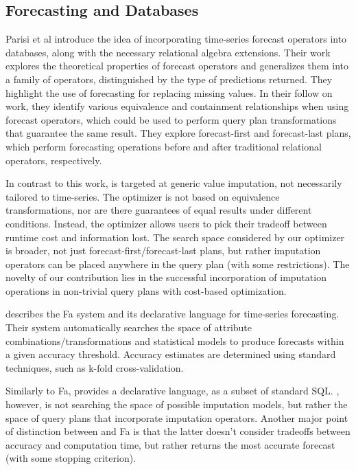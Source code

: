 \subsection{Forecasting and Databases}
Parisi et al\cite{parisi2011embedding} introduce the idea of incorporating time-series forecast operators into
databases, along with the necessary relational algebra extensions. Their work explores the theoretical
properties of forecast operators and generalizes them into a family of operators, distinguished by
the type of predictions returned. They highlight the use of forecasting for replacing missing values.
In their follow on work\cite{parisi2013temporal}, they identify various equivalence and containment
relationships when using forecast operators, which could be used to perform query plan transformations that guarantee the same result. They
explore forecast-first and forecast-last plans, which perform forecasting operations before and after traditional
relational operators, respectively.

In contrast to this work, \ProjectName{} is targeted at generic value imputation, not necessarily tailored to 
time-series. The optimizer is not based on equivalence transformations, nor are there guarantees of equal
results under different conditions. Instead, the optimizer allows users to pick their tradeoff between
runtime cost and information lost. The search space considered by our optimizer is broader, not just
forecast-first/forecast-last plans, but rather imputation operators can be placed anywhere in the query plan
(with some restrictions). The novelty of our contribution lies in the successful incorporation of
imputation operations in non-trivial query plans with cost-based optimization.

\cite{duan2007processing} describes the Fa system and its declarative language for time-series forecasting. Their
system automatically searches the space of attribute combinations/transformations and statistical models
to produce forecasts within a given accuracy threshold. Accuracy estimates are determined using
standard techniques, such as k-fold cross-validation. 

Similarly to Fa, \ProjectName{} provides a declarative language, as
a subset of standard SQL. \ProjectName{}, however, is not searching the space of possible
imputation models, but rather the space of query plans that incorporate imputation operators. Another major point
of distinction between \ProjectName{} and Fa is that the latter doesn't consider tradeoffs between accuracy and computation time, but rather returns the most accurate forecast (with some stopping criterion).



